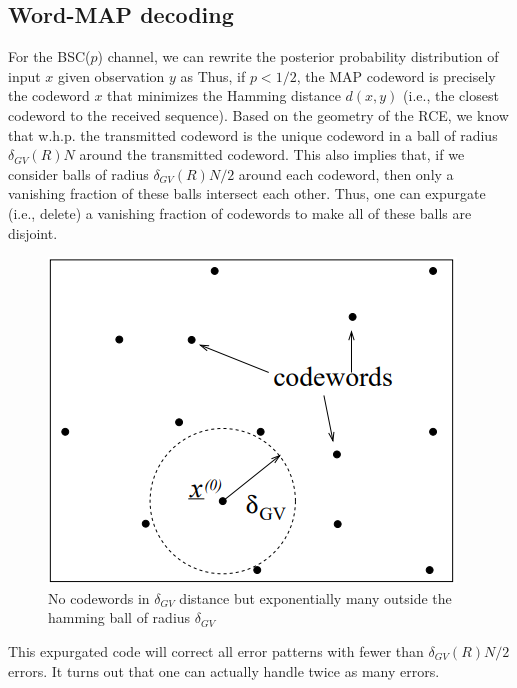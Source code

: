 \documentclass[letterpaper,english,10pt]{article}
\begin{document}
\subsection{Word-MAP decoding}
For the BSC($p$) channel, we can rewrite the posterior probability distribution of input $x$ given observation $y$ as 
Thus, if $p < 1/2$, the MAP codeword is precisely the codeword $x$ that minimizes the Hamming distance $d(x, y)$ (i.e., the closest codeword to the received sequence). 
Based on the geometry of the RCE, we know that w.h.p. the transmitted codeword is the unique codeword in a ball of radius $\delta_{GV}(R)N$ around the transmitted codeword. 
This also implies that, if we consider balls of radius $\delta_{GV}(R)N/2$ around each codeword, then only a vanishing fraction of these balls intersect each other. 
Thus, one can expurgate (i.e., delete) a vanishing fraction of codewords to make all of these balls are disjoint.\begin{figure}[h!]
    \centering
    \includegraphics[scale=0.5]{Lectures/2019/Figures/RCE2.png}
    \caption{No codewords in $\delta_{GV}$ distance but exponentially many outside the hamming ball of radius $\delta_{GV}$ }
    \label{fig:my_label}
\end{figure}  
This expurgated code will correct all error patterns with fewer than $\delta_{GV}(R)N/2$ errors.
It turns out that one can actually handle twice as many errors. 
\end{document}
